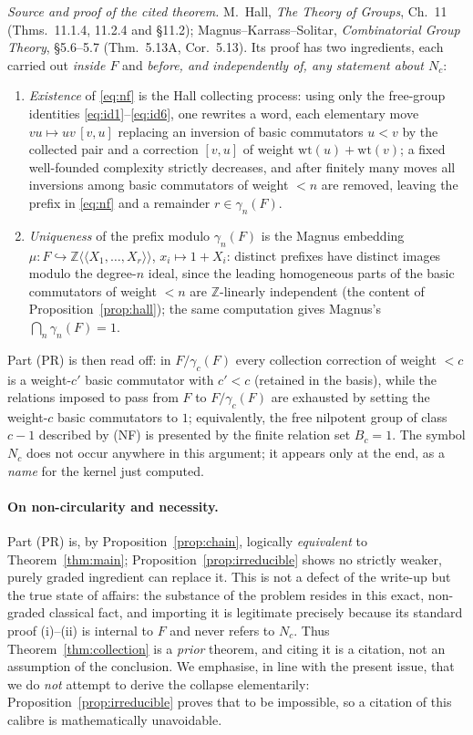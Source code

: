 \documentclass{amsart}
\theoremstyle{definition}
\theoremstyle{remark}
\begin{document}
\noindent\emph{Source and proof of the cited theorem.} M.~Hall, \emph{The Theory of Groups},
Ch.~11 (Thms.~11.1.4, 11.2.4 and \S11.2); Magnus--Karrass--Solitar, \emph{Combinatorial Group
Theory}, \S5.6--5.7 (Thm.~5.13A, Cor.~5.13). Its proof has two ingredients, each carried out
\emph{inside $F$} and \emph{before, and independently of, any statement about $N_c$}:
\begin{enumerate}
\item[(i)] \emph{Existence} of \eqref{eq:nf} is the Hall collecting process: using only the
free-group identities \eqref{eq:id1}--\eqref{eq:id6}, one rewrites a word, each elementary move
$vu\mapsto uv\,[v,u]$ replacing an inversion of basic commutators $u<v$ by the collected pair
and a correction $[v,u]$ of weight $\mathrm{wt}(u)+\mathrm{wt}(v)$; a fixed well-founded
complexity strictly decreases, and after finitely many moves all inversions among basic
commutators of weight $<n$ are removed, leaving the prefix in \eqref{eq:nf} and a remainder
$r\in\gamma_n(F)$.
\item[(ii)] \emph{Uniqueness} of the prefix modulo $\gamma_n(F)$ is the Magnus embedding
$\mu\colon F\hookrightarrow\mathbb Z\langle\!\langle X_1,\dots,X_r\rangle\!\rangle$,
$x_i\mapsto1+X_i$: distinct prefixes have distinct images modulo the degree-$n$ ideal, since the
leading homogeneous parts of the basic commutators of weight $<n$ are $\mathbb Z$-linearly
independent (the content of Proposition~\ref{prop:hall}); the same computation gives Magnus's
$\bigcap_n\gamma_n(F)=1$.
\end{enumerate}
Part (PR) is then read off: in $F/\gamma_c(F)$ every collection correction of weight $<c$ is a
weight-$c'$ basic commutator with $c'<c$ \textup{(}retained in the basis\textup{)}, while the
relations imposed to pass from $F$ to $F/\gamma_c(F)$ are exhausted by setting the weight-$c$
basic commutators to $1$; equivalently, the free nilpotent group of class $c-1$ described by
(NF) is presented by the finite relation set $B_c=1$. The symbol $N_c$ does not occur anywhere
in this argument; it appears only at the end, as a \emph{name} for the kernel just computed.

\paragraph{On non-circularity and necessity.} Part (PR) is, by Proposition~\ref{prop:chain},
logically \emph{equivalent} to Theorem~\ref{thm:main}; Proposition~\ref{prop:irreducible} shows
no strictly weaker, purely graded ingredient can replace it. This is not a defect of the
write-up but the true state of affairs: the substance of the problem resides in this exact,
non-graded classical fact, and importing it is legitimate precisely because its standard proof
(i)--(ii) is internal to $F$ and never refers to $N_c$. Thus Theorem~\ref{thm:collection} is a
\emph{prior} theorem, and citing it is a citation, not an assumption of the conclusion. We
emphasise, in line with the present issue, that we do \emph{not} attempt to derive the collapse
elementarily: Proposition~\ref{prop:irreducible} proves that to be impossible, so a citation of
this calibre is mathematically unavoidable.
\end{document}
